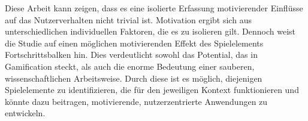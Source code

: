 Diese Arbeit kann zeigen, dass es eine isolierte Erfassung motivierender Einflüsse auf das Nutzerverhalten nicht trivial ist. Motivation ergibt sich aus unterschiedlichen individuellen Faktoren, die es zu isolieren gilt. Dennoch weist die Studie auf einen möglichen motivierenden Effekt des Spielelements Fortschrittsbalken hin. Dies verdeutlicht sowohl das Potential, das in Gamification steckt, als auch die enorme Bedeutung einer sauberen, wissenschaftlichen Arbeitsweise. Durch diese ist es möglich, diejenigen Spielelemente zu identifizieren, die für den jeweiligen Kontext funktionieren und könnte dazu beitragen, motivierende, nutzerzentrierte Anwendungen zu entwickeln.